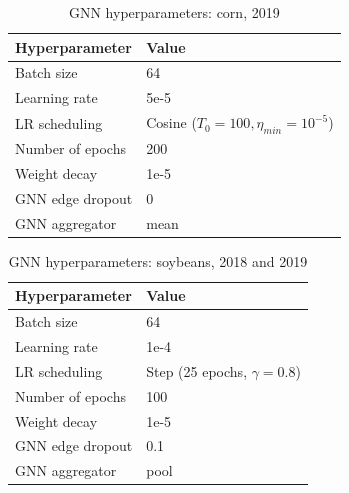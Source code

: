 \begin{table}[H]
\centering
\begin{tabular}{|l|l|} \hline
\textbf{Hyperparameter} & \textbf{Value} \\ \hline
Batch size & 64 \\ \hline
Learning rate & 5e-5 \\ \hline
LR scheduling & Cosine ($T_0 = 100, \eta_{min} = 10^{-5}$)  \\ \hline
Number of epochs & 200 \\ \hline
Weight decay & 1e-5 \\ \hline
GNN edge dropout & 0 \\ \hline
GNN aggregator & mean \\ \hline
\end{tabular}
\caption{GNN hyperparameters: corn, 2019}
\label{hyperparams_gnn_corn_2019}
\end{table}


\begin{table}[H]
\centering
\begin{tabular}{|l|l|} \hline
\textbf{Hyperparameter} & \textbf{Value} \\ \hline
Batch size & 64 \\ \hline
Learning rate & 1e-4 \\ \hline
LR scheduling & Step (25 epochs, $\gamma = 0.8$)  \\ \hline
Number of epochs & 100 \\ \hline
Weight decay & 1e-5 \\ \hline
GNN edge dropout & 0.1 \\ \hline
GNN aggregator & pool \\ \hline
\end{tabular}
\caption{GNN hyperparameters: soybeans, 2018 and 2019}
\label{hyperparams_gnn_soybeans_2018}
\end{table}


